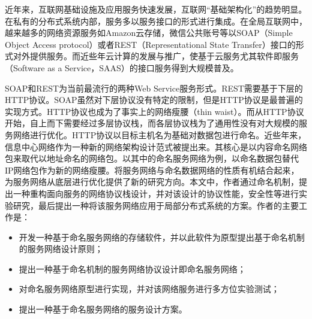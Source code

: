 \begin{cabstract}
   近年来，互联网基础设施及应用服务快速发展，互联网“基础架构化”的趋势明显。在私有的分布式系统内部，服务多以服务接口的形式进行集成。在全局互联网中，越来越多的网络资源服务如Amazon云存储，微信公共账号等以SOAP（Simple Object Access protocol）或者REST（Representational State Transfer）接口的形式对外提供服务。而近些年云计算的发展与推广，使基于云服务尤其软件即服务（Software as a Service，SAAS）的接口服务得到大规模普及。

   SOAP和REST为当前最流行的两种Web Service服务形式。REST需要基于下层的HTTP协议。SOAP虽然对下层协议没有特定的限制，但是HTTP协议是最普遍的实现方式。HTTP协议也成为了事实上的网络瘦腰（thin waist）。而从HTTP协议开始，自上而下需要经过多层协议栈，而各层协议栈为了通用性没有对大规模的服务网络进行优化。HTTP协议以目标主机名为基础对数据包进行命名。近些年来，信息中心网络作为一种新的网络架构设计范式被提出来。其核心是以内容命名网络包来取代以地址命名的网络包。以其中的命名服务网络为例，以命名数据包替代IP网络包作为新的网络瘦腰。将服务网络与命名数据网络的性质有机结合起来，为服务网络从底层进行优化提供了新的研究方向。本文中，作者通过命名机制，提出一种重构面向服务的网络协议栈设计，并对该设计的协议性能，安全性等进行实验研究，最后提出一种将该服务网络应用于局部分布式系统的方案。作者的主要工作是：

  \begin{itemize}
    \item 开发一种基于命名服务网络的存储软件，并以此软件为原型提出基于命名机制的服务网络设计原则；
    \item 提出一种基于命名机制的服务网络协议设计即命名服务网络；
    \item 对命名服务网络原型进行实现，并对该网络服务进行多方位实验测试；
    \item 提出一种基于命名服务网络的服务设计方案。
  \end{itemize}
\end{cabstract}


